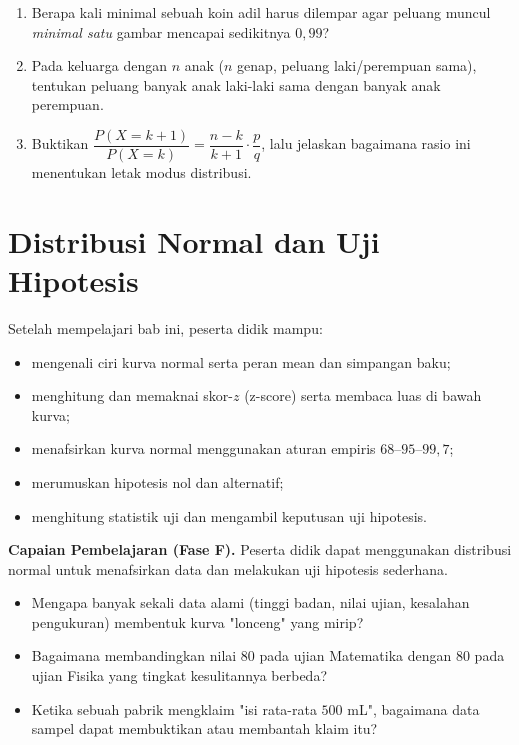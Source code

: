 \documentclass[11pt,a4paper]{report}
\theoremstyle{gaya}
\begin{document}
\begin{challenge}
\begin{enumerate}[leftmargin=*,topsep=2pt]
  \item Berapa kali minimal sebuah koin adil harus dilempar agar peluang muncul \emph{minimal satu} gambar mencapai sedikitnya $0{,}99$?
  \item Pada keluarga dengan $n$ anak ($n$ genap, peluang laki/perempuan sama), tentukan peluang banyak anak laki-laki sama dengan banyak anak perempuan.
  \item Buktikan $\dfrac{P(X=k+1)}{P(X=k)}=\dfrac{n-k}{k+1}\cdot\dfrac{p}{q}$, lalu jelaskan bagaimana rasio ini menentukan letak modus distribusi.
\end{enumerate}
\end{challenge}

\chapter{Distribusi Normal dan Uji Hipotesis}
\begin{tujuan}
Setelah mempelajari bab ini, peserta didik mampu:
\begin{itemize}[leftmargin=*,topsep=2pt]
  \item mengenali ciri kurva normal serta peran mean dan simpangan baku;
  \item menghitung dan memaknai skor-$z$ (z-score) serta membaca luas di bawah kurva;
  \item menafsirkan kurva normal menggunakan aturan empiris $68$--$95$--$99{,}7$;
  \item merumuskan hipotesis nol dan alternatif;
  \item menghitung statistik uji dan mengambil keputusan uji hipotesis.
\end{itemize}
\textbf{Capaian Pembelajaran (Fase F).} Peserta didik dapat menggunakan distribusi normal untuk menafsirkan data dan melakukan uji hipotesis sederhana.
\end{tujuan}

\begin{pemantik}
\begin{itemize}[leftmargin=*,topsep=2pt]
  \item Mengapa banyak sekali data alami (tinggi badan, nilai ujian, kesalahan pengukuran) membentuk kurva "lonceng" yang mirip?
  \item Bagaimana membandingkan nilai $80$ pada ujian Matematika dengan $80$ pada ujian Fisika yang tingkat kesulitannya berbeda?
  \item Ketika sebuah pabrik mengklaim "isi rata-rata $500$ mL", bagaimana data sampel dapat membuktikan atau membantah klaim itu?
\end{itemize}
\end{pemantik}
\end{document}
